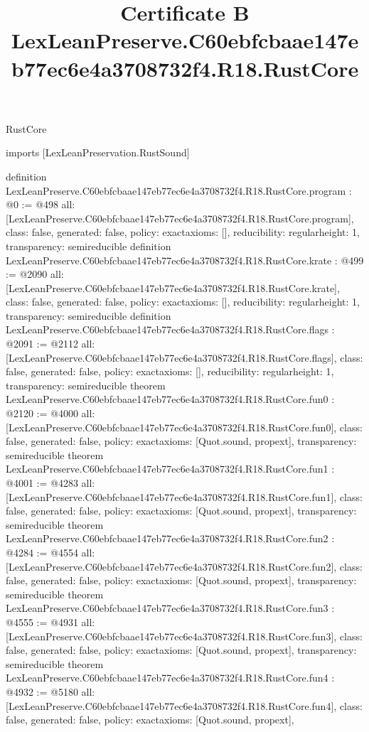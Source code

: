 \begin{lexlean}{RustCore}
\title{Certificate B LexLeanPreserve.C60ebfcbaae147eb77ec6e4a3708732f4.R18.RustCore}
\begin{coremodule}
imports [LexLeanPreservation.RustSound]

definition LexLeanPreserve.C60ebfcbaae147eb77ec6e4a3708732f4.R18.RustCore.program : @0 := @498 {
  all: [LexLeanPreserve.C60ebfcbaae147eb77ec6e4a3708732f4.R18.RustCore.program],
  class: false,
  generated: false,
  policy: exact{axioms: []},
  reducibility: regular{height: 1},
  transparency: semireducible
}
definition LexLeanPreserve.C60ebfcbaae147eb77ec6e4a3708732f4.R18.RustCore.krate : @499 := @2090 {
  all: [LexLeanPreserve.C60ebfcbaae147eb77ec6e4a3708732f4.R18.RustCore.krate],
  class: false,
  generated: false,
  policy: exact{axioms: []},
  reducibility: regular{height: 1},
  transparency: semireducible
}
definition LexLeanPreserve.C60ebfcbaae147eb77ec6e4a3708732f4.R18.RustCore.flags : @2091 := @2112 {
  all: [LexLeanPreserve.C60ebfcbaae147eb77ec6e4a3708732f4.R18.RustCore.flags],
  class: false,
  generated: false,
  policy: exact{axioms: []},
  reducibility: regular{height: 1},
  transparency: semireducible
}
theorem LexLeanPreserve.C60ebfcbaae147eb77ec6e4a3708732f4.R18.RustCore.fun0 : @2120 := @4000 {
  all: [LexLeanPreserve.C60ebfcbaae147eb77ec6e4a3708732f4.R18.RustCore.fun0],
  class: false,
  generated: false,
  policy: exact{axioms: [Quot.sound, propext]},
  transparency: semireducible
}
theorem LexLeanPreserve.C60ebfcbaae147eb77ec6e4a3708732f4.R18.RustCore.fun1 : @4001 := @4283 {
  all: [LexLeanPreserve.C60ebfcbaae147eb77ec6e4a3708732f4.R18.RustCore.fun1],
  class: false,
  generated: false,
  policy: exact{axioms: [Quot.sound, propext]},
  transparency: semireducible
}
theorem LexLeanPreserve.C60ebfcbaae147eb77ec6e4a3708732f4.R18.RustCore.fun2 : @4284 := @4554 {
  all: [LexLeanPreserve.C60ebfcbaae147eb77ec6e4a3708732f4.R18.RustCore.fun2],
  class: false,
  generated: false,
  policy: exact{axioms: [Quot.sound, propext]},
  transparency: semireducible
}
theorem LexLeanPreserve.C60ebfcbaae147eb77ec6e4a3708732f4.R18.RustCore.fun3 : @4555 := @4931 {
  all: [LexLeanPreserve.C60ebfcbaae147eb77ec6e4a3708732f4.R18.RustCore.fun3],
  class: false,
  generated: false,
  policy: exact{axioms: [Quot.sound, propext]},
  transparency: semireducible
}
theorem LexLeanPreserve.C60ebfcbaae147eb77ec6e4a3708732f4.R18.RustCore.fun4 : @4932 := @5180 {
  all: [LexLeanPreserve.C60ebfcbaae147eb77ec6e4a3708732f4.R18.RustCore.fun4],
  class: false,
  generated: false,
  policy: exact{axioms: [Quot.sound, propext]},
}
\end{coremodule}
\end{lexlean}
